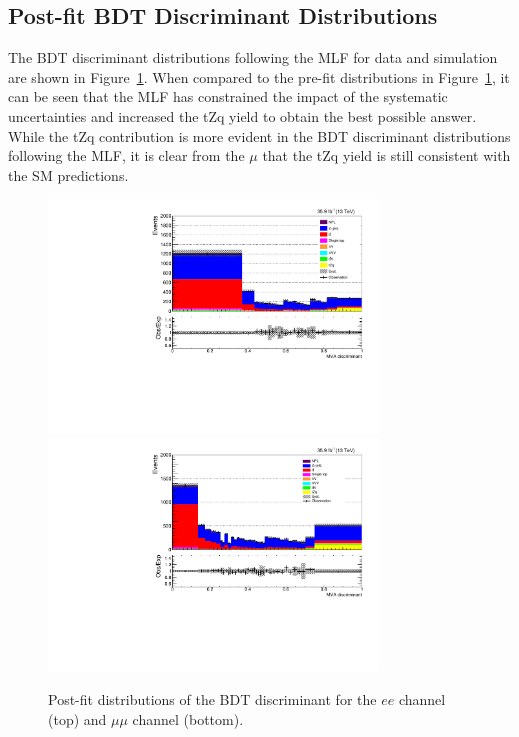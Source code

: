 \subsection{Post-fit BDT Discriminant Distributions}
The BDT discriminant distributions following the MLF for data and simulation are shown in Figure~\ref{fig:postfitBDT}.
When compared to the pre-fit distributions in Figure~\ref{fig:postfitBDT}, it can be seen that the MLF has constrained the impact of the systematic uncertainties and increased the tZq yield to obtain the best possible answer.
While the tZq contribution is more evident in the BDT discriminant distributions following the MLF, it is clear from the $\mu$ that the tZq yield is still consistent with the SM predictions.

\begin{figure}[!h]
\centering
\includegraphics[width=0.78\textwidth]{figs/results/postfit_ee.pdf}
\\
\includegraphics[width=0.78\textwidth]{figs/results/postfit_mumu.pdf}
\caption{
Post-fit distributions of the BDT discriminant for the $ee$ channel (top) and $\mu\mu$ channel (bottom).}
\label{fig:postfitBDT}
\end{figure}

